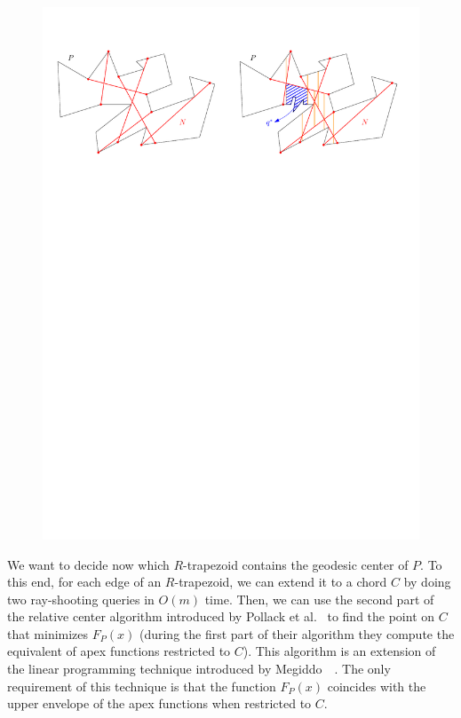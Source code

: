 \documentclass[a4paper,UKenglish]{lipics}
\newcommand{\F}[2]{\ensuremath{F_{\scriptscriptstyle #1}(#2)}}
\begin{document}
\begin{figure}[tb]
\centering
\includegraphics[width=1\textwidth]{img/CuttingOfChords.pdf}
\caption{\small }
\label{fig:Cutting of Chords}
\end{figure}

We want to decide now which $R$-trapezoid contains the geodesic center of $P$. 
To this end, for each edge of an $R$-trapezoid, we can extend it to a chord $C$ by doing two ray-shooting queries in $O(m)$ time. Then, we can use the second part of the relative center algorithm introduced by Pollack et al.~\cite[Section~3]{pollackComputingCenter} to find the point on $C$ that minimizes $\F{P}{x}$ (during the first part of their algorithm they compute the equivalent of apex functions restricted to $C$).
This algorithm is an extension of the linear programming technique introduced by Megiddo~~\cite{megiddo1982linear}. 
The only requirement of this technique is that the function $\F{P}{x}$ coincides with the upper envelope of the apex functions when restricted to $C$.
\end{document}
